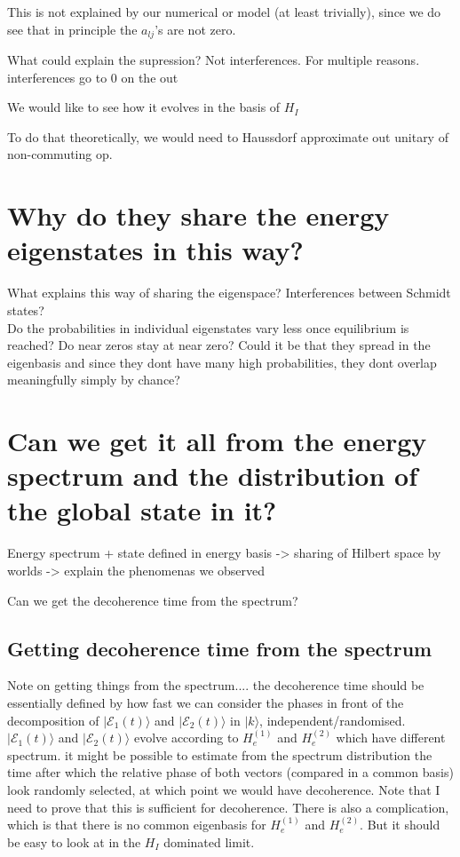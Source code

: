 \documentclass{article}
\begin{document}
This is not explained by our numerical or model (at least trivially), since we do see that in principle the $a_{lj}$'s are not zero.

What could explain the supression? Not interferences. For multiple reasons. interferences go to 0 on the out


We would like to see how it evolves in the basis of $H_I$

To do that theoretically, we would need to Haussdorf approximate out unitary of non-commuting op.


\newpage


\section{Why do they share the energy eigenstates in this way?}
 

What explains this way of sharing the eigenspace? Interferences between Schmidt states? \\

{\color{teal} Do the probabilities in individual eigenstates vary less once equilibrium is reached? Do near zeros stay at near zero? Could it be that they spread in the eigenbasis and since they dont have many high probabilities, they dont overlap meaningfully simply by chance?}

\section{Can we get it all from the energy spectrum and the distribution of the global state in it?}

Energy spectrum + state defined in energy basis -> sharing of Hilbert space by worlds -> explain the phenomenas we observed


Can we get the decoherence time from the spectrum?

\subsection{Getting decoherence time from the spectrum}

Note on getting things from the spectrum.... the decoherence time should be essentially defined by how fast we can consider the phases in front of the decomposition of $|\mathcal{E}_1(t)\rangle$ and $|\mathcal{E}_2(t)\rangle$ in $|k\rangle$, independent/randomised. $|\mathcal{E}_1(t)\rangle$ and $|\mathcal{E}_2(t)\rangle$ evolve according to $H_e^{(1)}$ and $H_e^{(2)}$ which have different spectrum. it might be possible to estimate from the spectrum distribution the time after which the relative phase of both vectors (compared in a common basis) look randomly selected, at which point we would have decoherence. Note that I need to prove that this is sufficient for decoherence. There is also a complication, which is that there is no common eigenbasis for $H_e^{(1)}$ and $H_e^{(2)}$. But it should be easy to look at in the $H_I$ dominated limit.
\end{document}
